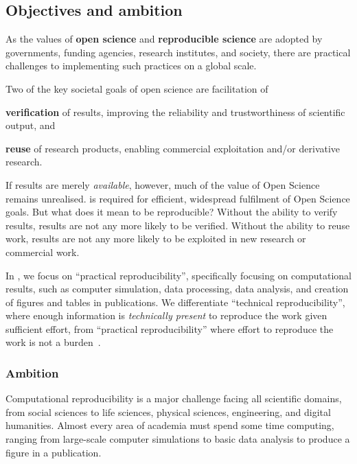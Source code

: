 \subsection{Objectives and ambition}

\label{sect:objectives}

As the values of \textbf{open science} and \textbf{reproducible science} are adopted by
governments, funding agencies, research institutes, and society,
there are practical challenges to implementing such practices on a global scale.

Two of the key societal goals of open science are facilitation of
\begin{compactitem}
\item \textbf{verification} of results, improving the reliability and trustworthiness of scientific output, and
\item \textbf{reuse} of research products, enabling commercial exploitation and/or derivative research.
\end{compactitem}

\noindent If results are merely \emph{available}, however,
much of the value of Open Science remains unrealised.
 is required for efficient, widespread fulfilment of Open Science goals.
But what does it mean to be reproducible?
Without the  ability to verify results, results are not
any more likely to be verified.
Without the  ability to reuse work, results are not
any more likely to be exploited in new research or commercial work.

In \TheProject, we focus on ``practical reproducibility'',
specifically focusing on computational results, such as computer simulation, data
processing, data analysis, and creation of figures and tables in publications.
We differentiate ``technical reproducibility'',
where enough information is \emph{technically present} to reproduce the work given sufficient effort,
from ``practical reproducibility''
where effort to reproduce the work is not a burden~\cite{binder}.

\subsubsection{Ambition}

Computational reproducibility is a major challenge facing all scientific domains,
from social sciences to life sciences, physical sciences, engineering, and digital humanities.
Almost every area of academia must spend some time computing,
ranging from large-scale computer simulations to basic data analysis to produce a figure in a publication.

